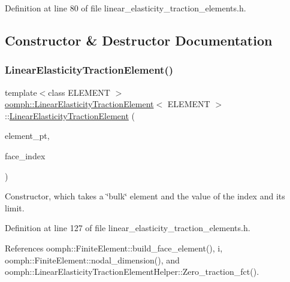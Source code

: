 Definition at line 80 of file linear\+\_\+elasticity\+\_\+traction\+\_\+elements.\+h.



\subsection{Constructor \& Destructor Documentation}
\mbox{\label{classoomph_1_1LinearElasticityTractionElement_a77439a3f9cc538b690e43f9198e6b6f1}} 
\subsubsection{\texorpdfstring{Linear\+Elasticity\+Traction\+Element()}{LinearElasticityTractionElement()}}
{\footnotesize\ttfamily template$<$class E\+L\+E\+M\+E\+NT $>$ \\
\hyperlink{classoomph_1_1LinearElasticityTractionElement}{oomph\+::\+Linear\+Elasticity\+Traction\+Element}$<$ E\+L\+E\+M\+E\+NT $>$\+::\hyperlink{classoomph_1_1LinearElasticityTractionElement}{Linear\+Elasticity\+Traction\+Element} (\begin{DoxyParamCaption}\item[{\hyperlink{classoomph_1_1FiniteElement}{Finite\+Element} $\ast$const \&}]{element\+\_\+pt,  }\item[{const int \&}]{face\+\_\+index }\end{DoxyParamCaption})\hspace{0.3cm}{\ttfamily [inline]}}



Constructor, which takes a \char`\"{}bulk\char`\"{} element and the value of the index and its limit. 



Definition at line 127 of file linear\+\_\+elasticity\+\_\+traction\+\_\+elements.\+h.



References oomph\+::\+Finite\+Element\+::build\+\_\+face\+\_\+element(), i, oomph\+::\+Finite\+Element\+::nodal\+\_\+dimension(), and oomph\+::\+Linear\+Elasticity\+Traction\+Element\+Helper\+::\+Zero\+\_\+traction\+\_\+fct().



